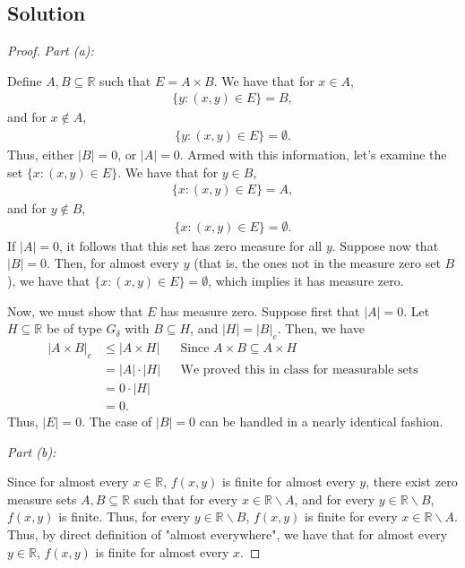 \documentclass[10pt,a4paper]{article}
\makeatletter
\theoremstyle{theorem}
\newcommand{\proofpart}[2]{%
  \par
  \addvspace{\medskipamount}%
  \noindent\emph{Part #1: #2}\par\nobreak
  \addvspace{\smallskipamount}%
  \@afterheading
}
\theoremstyle{definition}
\makeatother
\begin{document}
\subsection*{Solution}
\begin{proof}
\proofpart{(a)}{} Define $A,B \subseteq \mathbb{R}$ such that $E = A \times B$. We have that for $x \in A$, 
\begin{align*}
\{y : (x, y) \in E \} = B,
\end{align*}
and for $x \not \in A$,
\begin{align*}
\{y : (x, y) \in E \} = \emptyset.
\end{align*}
Thus, either $|B| = 0$, or $|A| = 0$. Armed with this information, let's examine the set $\{x : (x, y) \in E \}$. We have that for $y \in B$,
\begin{align*}
\{x : (x, y) \in E \} = A,
\end{align*}
and for $y \not \in B$,
\begin{align*}
\{x : (x, y) \in E \} = \emptyset.
\end{align*}
If $|A| = 0$, it follows that this set has zero measure for all $y$. Suppose now that $|B| = 0$. Then, for almost every $y$ (that is, the ones not in the measure zero set $B$), we have that $\{x : (x, y) \in E \} = \emptyset$, which implies it has measure zero.

Now, we must show that $E$ has measure zero. Suppose first that $|A| = 0$. Let $H \subseteq \mathbb{R}$ be of type $G_\delta$ with $B \subseteq H$, and $|H| = |B|_e$. Then, we have
\begin{align*}
|A \times B|_e &\leq |A \times H| &&\text{Since } A \times B \subseteq A \times H\\
&= |A| \cdot |H| &&\text{We proved this in class for measurable sets}\\
&= 0 \cdot |H|\\
&= 0.
\end{align*}
Thus, $|E| = 0$. The case of $|B| = 0$ can be handled in a nearly identical fashion.

\proofpart{(b)}{} Since for almost every $x \in \mathbb{R}$, $f(x, y)$ is finite for almost every $y$, there exist zero measure sets $A, B \subseteq \mathbb{R}$ such that for every $x \in \mathbb{R} \backslash A$, and for every $y \in \mathbb{R} \backslash B$, $f(x, y)$ is finite. Thus, for every $y \in \mathbb{R} \backslash B$, $f(x, y)$ is finite for every $x \in \mathbb{R} \backslash A$. Thus, by direct definition of "almost everywhere", we have that for almost every $y \in \mathbb{R}$, $f(x, y)$ is finite for almost every $x$.
\end{proof}
\end{document}

